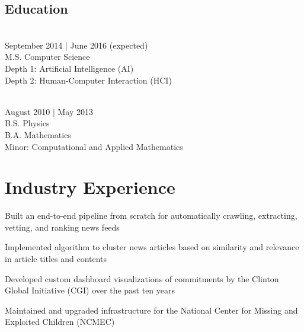 \documentclass{onkursen-resume}
\begin{document}
\begin{multicols}{2}

\section*{Education}

\\
September 2014 | June 2016 (expected)\\
M.S. Computer Science\\
Depth 1: Artificial Intelligence (AI)\\
Depth 2: Human-Computer Interaction (HCI)\\

\vspace{6mm}

\\
August 2010 | May 2013\\
B.S. Physics\\
B.A. Mathematics\\
Minor: Computational and Applied Mathematics

\end{multicols}

\vspace{-2mm}

\hr

\section*{Industry Experience}

\begin{itemize*}
\item Built an end-to-end pipeline from scratch for automatically crawling, extracting, vetting, and ranking news feeds
\item Implemented algorithm to cluster news articles based on similarity and relevance in article titles and contents
\end{itemize*}
\vspace{-1mm}

\begin{itemize*}
\item Developed custom dashboard visualizations of commitments by the Clinton Global Initiative (CGI) over the past ten years
\item Maintained and upgraded infrastructure for the National Center for Missing and Exploited Children (NCMEC)
\end{itemize*}
\vspace{-1mm}
\end{document}
